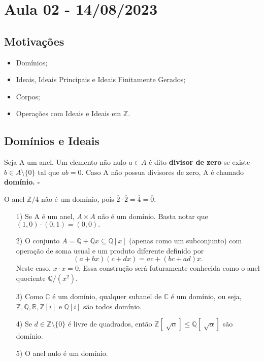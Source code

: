 \documentclass[AlgebraII/algebraII_notes.tex]{subfiles}
\begin{document}
\section{Aula 02 - 14/08/2023}
\subsection{Motivações}
\begin{itemize}
	\item Domínios;
	\item Ideais, Ideais Principais e Ideais Finitamente Gerados;
	\item Corpos;
	\item Operações com Ideais e Ideais em \(\mathbb{Z}\).
\end{itemize}
\subsection{Domínios e Ideais}
\begin{def*}
	Seja A um anel. Um elemento não nulo \(a\in A\) é dito \textbf{divisor de zero} se existe \(b\in A\setminus{\{0\}}\) tal que
	\(ab = 0.\) Caso A não possua divisores de zero, A é chamado \textbf{domínio.} \(\square\)
\end{def*}
\begin{example}
	O anel \(\mathbb{Z}/4\) não é um domínio, pois \(\overline{2}\cdot \overline{2} = \overline{4} = \overline{0}.\)
\end{example}
\begin{example}
	\begin{itemize}
		\item[1)] Se A é um anel, \(A\times A\) não é um domínio. Basta notar que \((1, 0)\cdot (0, 1) = (0, 0).\)
		\item[2)] O conjunto \(A = \mathbb{Q} + \mathbb{Q}x \subseteq{\mathbb{Q}[x]}\) (apenas como um subconjunto) com operação de soma usual e um
		      produto diferente definido por
		      \[
			      (a+bx)(c+dx) = ac + (bc+ad)x.
		      \]
		      Neste caso, \(x \cdot x = 0.\) Essa construção será futuramente conhecida como o anel quociente \(\mathbb{Q}/(x^{2}).\)
		\item[3)] Como \(\mathbb{C}\) é um domínio, qualquer subanel de \(\mathbb{C}\) é um domínio, ou seja, \(\mathbb{Z}, \mathbb{Q}, \mathbb{R}, \mathbb{Z}[i]\) e \(\mathbb{Q}[i]\)
		      são todos domínio.
		\item[4)] Se \(d\in \mathbb{Z}\setminus{\{0\}}\) é livre de quadrados, então \(\mathbb{Z}[\sqrt[]{\alpha }]\leq \mathbb{Q}[\sqrt[]{\alpha }] \) são domínio.
		\item[5)] O anel nulo é um domínio.
	\end{itemize}
\end{example}
\end{document}
